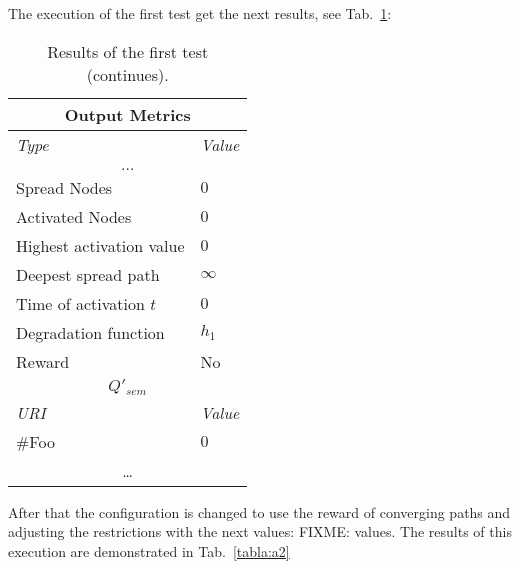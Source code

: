 The execution of the first test get the next results, see Tab.~\ref{tabla:a1}:

\begin{longtable}{|p{10cm}|p{4cm}|}        
        \caption{Results of the first test.}
        \label{tabla:a1}\\ \hline
        \multicolumn{2}{|c|}{\textbf{Output Metrics}}\\
        \hline
        \textit{Type} &  \textit{Value} \\
        \hline
        \endfirsthead
        \caption[]{Results of the first test (continues).}\\
        \hline
        \endhead
        \hline
        \multicolumn{2}{|c|}{$\ldots$}\\
        \hline
        \endfoot
        \hline
        \endlastfoot	    
	                Spread Nodes & $0$ \\ \hline
		        Activated Nodes& $0$ \\ \hline
		        Highest activation value & $0$ \\ \hline
		        Deepest spread path &  $\infty$ \\ \hline
		        Time of activation $t$ & $0$\\ \hline
		        Degradation function &$h_1$\\ \hline
		        Reward &No\\ \hline
         \multicolumn{2}{|c|}{\textbf{$Q'_{sem}$}}\\\hline
           \textit{URI} &  \textit{Value} \\ \hline
	        \#Foo&  $0$ \\ \hline
	         \multicolumn{2}{|c|}{\ldots}\\\hline
     \end{longtable}      

After that the configuration is changed to use the reward of converging paths and adjusting the restrictions with the next values:
FIXME: values. The results of this execution are demonstrated in Tab.~\ref{tabla:a2}

